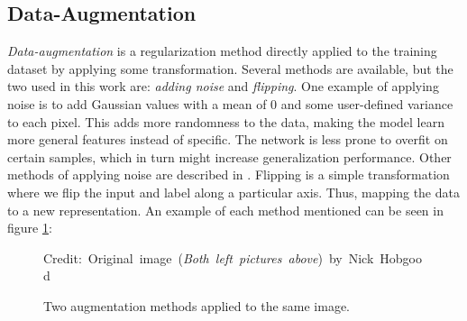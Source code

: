 \subsection{Data-Augmentation} \label{data-augmentation}
     \textit{Data-augmentation} is a regularization method directly applied to the training dataset by applying some transformation\cite{kukavcka2017_regularization}. Several methods are available, but the two used in this work are: \textit{adding noise} and \textit{flipping}. One example of applying noise is to add Gaussian values with a mean of 0 and some user-defined variance to each pixel. This adds more randomness to the data, making the model learn more general features instead of specific. The network is less prone to overfit on certain samples, which in turn might increase generalization performance. Other methods of applying noise are described in \citeauthor{kukavcka2017_regularization}\cite{kukavcka2017_regularization}. Flipping is a simple transformation where we flip the input and label along a particular axis. Thus, mapping the data to a new representation. An example of each method mentioned can be seen in figure \ref{data augmentation fig}:
    \begin{figure}[H]
        \centering
        
        
        
        
        \caption[Two data augmentation examples]{Two augmentation methods applied to the same image.}
        \medskip 
        \hspace*{15pt}\hbox{\scriptsize Credit: Original image (\textit{Both left pictures above}) by Nick Hobgood\cite{clownfish_image}}
        \label{data augmentation fig}
        
        \end{figure}
    

